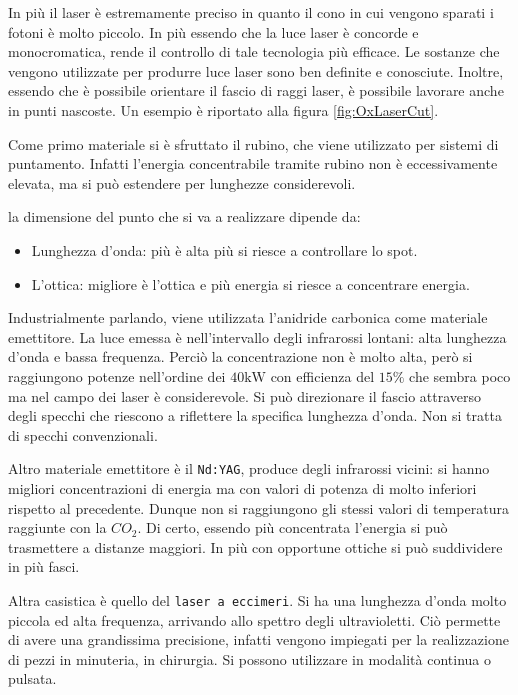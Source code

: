 In più il laser è estremamente preciso in quanto il cono in cui vengono sparati i fotoni è molto piccolo.
In più essendo che la luce laser è concorde e monocromatica, rende il controllo di tale tecnologia più efficace.
Le sostanze che vengono utilizzate per produrre luce laser sono ben definite e conosciute.
Inoltre, essendo che è possibile orientare il fascio di raggi laser, è possibile lavorare anche in punti nascoste. Un esempio è riportato alla figura \ref{fig:OxLaserCut}.

Come primo materiale si è sfruttato il rubino, che viene utilizzato per sistemi di puntamento. Infatti l'energia concentrabile tramite rubino non è eccessivamente elevata, ma si può estendere per lunghezze considerevoli.

la dimensione del punto che si va a realizzare dipende da:
\begin{itemize}
\item Lunghezza d'onda: più è alta più si riesce a controllare lo spot.
\item L'ottica: migliore è l'ottica e più energia si riesce a concentrare energia.
\end{itemize}

Industrialmente parlando, viene utilizzata l'anidride carbonica come materiale emettitore. La luce emessa è nell'intervallo degli infrarossi lontani: alta lunghezza d'onda e bassa frequenza.
Perciò la concentrazione non è molto alta, però si raggiungono potenze nell'ordine dei $40\unit{\kW}$ con efficienza del $15\%$ che sembra poco ma nel campo dei laser è considerevole.
Si può direzionare il fascio attraverso degli specchi che riescono a riflettere la specifica lunghezza d'onda. Non si tratta di specchi convenzionali.

Altro materiale emettitore è il \texttt{Nd:YAG}, produce degli infrarossi vicini: si hanno migliori concentrazioni di energia ma con valori di potenza di molto inferiori rispetto al precedente. Dunque non si raggiungono gli stessi valori di temperatura raggiunte con la $CO_2$.
Di certo, essendo più concentrata l'energia si può trasmettere a distanze maggiori. In più con opportune ottiche si può suddividere in più fasci.

Altra casistica è quello del \texttt{laser a eccimeri}. Si ha una lunghezza d'onda molto piccola ed alta frequenza, arrivando allo spettro degli ultravioletti. 
Ciò permette di avere una grandissima precisione, infatti vengono impiegati per la realizzazione di pezzi in minuteria, in chirurgia.
Si possono utilizzare in modalità continua o pulsata.

